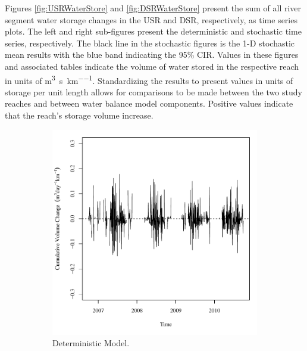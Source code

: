 \begin{linenumbers}
Figures \ref{fig:USRWaterStore} and \ref{fig:DSRWaterStore} present the sum of all river segment water storage changes in the USR and DSR, respectively, as time series plots.  The left and right sub-figures present the deterministic and stochastic time series, respectively.  The black line in the stochastic figures is the 1-D stochastic mean results with the blue band indicating the 95\% CIR.  Values in these figures and associated tables indicate the volume of water stored in the respective reach in units of \si{\cubic\meter\per\second\per\kilo\meter}.  Standardizing the results to present values in units of storage per unit length allows for comparisons to be made between the two study reaches and between water balance model components.  Positive values indicate that the reach's storage volume increase. 

\begin{figure}[htbp]
\centering
	\begin{subfigure}{0.5\textwidth}
		\centering
		\includegraphics[width=0.9\linewidth]{"Figures/Results_DUSR/Balance Water - storage"}
		\caption{Deterministic Model.}
		\label{sub:USRWaterStoreD}
	\end{subfigure}%
	\begin{subfigure}{0.5\textwidth}
		\centering

\end{subfigure}
\end{figure}
\end{linenumbers}
